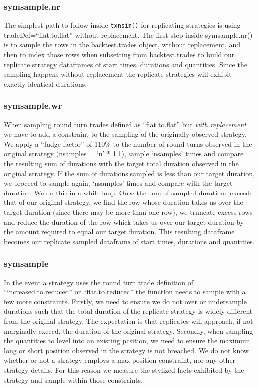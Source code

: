 \hypertarget{symsample.nr}{%
\subsubsection{symsample.nr}\label{symsample.nr}}

The simplest path to follow inside \texttt{txnsim()} for replicating
strategies is using tradeDef=``flat.to.flat'' without replacement. The
first step inside symsample.nr() is to sample the rows in the
backtest.trades object, without replacement, and then to index those
rows when subsetting from backtest.trades to build our replicate
strategy dataframes of start times, durations and quantities. Since the
sampling happens without replacement the replicate strategies will
exhibit exactly identical durations.

\hypertarget{symsample.wr}{%
\subsubsection{symsample.wr}\label{symsample.wr}}

When sampling round turn trades defined as ``flat.to.flat'' but
\emph{with replacement} we have to add a constraint to the sampling of
the originally observed strategy. We apply a ``fudge factor'' of 110\%
to the number of round turns observed in the original strategy (nsamples
= `n' * 1.1), sample `nsamples' times and compare the resulting sum of
durations with the target total duration observed in the original
strategy. If the sum of durations sampled is less than our target
duration, we proceed to sample again, `nsamples' times and compare with
the target duration. We do this in a while loop. Once the sum of sampled
durations exceeds that of our original strategy, we find the row whose
duration takes us over the target duration (since there may be more than
one row), we truncate excess rows and reduce the duration of the row
which takes us over our target duration by the amount required to equal
our target duration. This resulting dataframe becomes our replicate
sampled dataframe of start times, durations and quantities.

\hypertarget{symsample}{%
\subsubsection{symsample}\label{symsample}}

In the event a strategy uses the round turn trade definition of
``increased.to.reduced'' or ``flat.to.reduced'' the function needs to
sample with a few more constraints. Firstly, we need to ensure we do not
over or undersample durations such that the total duration of the
replicate strategy is widely different from the original strategy. The
expectation is that replicates will approach, if not marginally exceed,
the duration of the original strategy. Secondly, when sampling the
quantities to level into an existing position, we need to ensure the
maximum long or short position observed in the strategy is not breached.
We do not know whether or not a strategy employs a max position
constraint, nor any other strategy details. For this reason we measure
the stylized facts exhibited by the strategy and sample within those
constraints.

